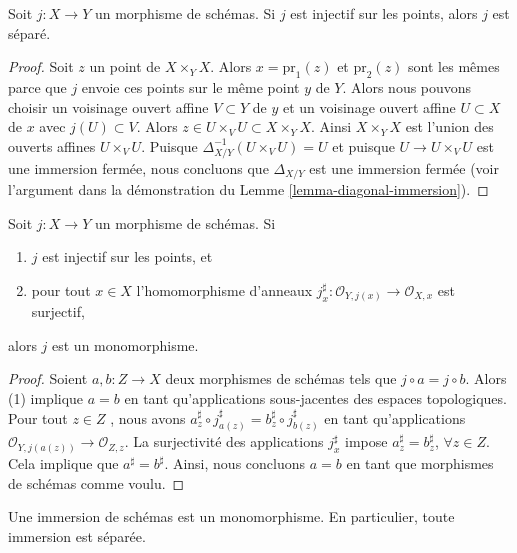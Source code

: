 \begin{lemma}
\label{lemma-injective-points}
Soit  $j : X \to Y$  un morphisme de schémas. Si  $j$  est injectif sur les
points, alors  $j$  est séparé.
\end{lemma}

\begin{proof}
Soit  $z$  un point de  $X \times_Y X$. Alors  $x = \text{pr}_1(z)$  et  $\text{pr}_2(z)$ 
sont les mêmes parce que  $j$  envoie ces points sur le même point
 $y$  de  $Y$. Alors nous pouvons choisir un voisinage ouvert
affine  $V \subset Y$  de  $y$  et un voisinage ouvert affine  $U \subset X$  de
 $x$  avec  $j(U) \subset V$. Alors  $z \in U \times_V U \subset X \times_Y X$. Ainsi  $X \times_Y X$  est l'union
des ouverts affines  $U \times_V U$. Puisque  $\Delta_{X/Y}^{-1}(U \times_V U) = U$  et puisque  $U \to U \times_V U$  est
une immersion fermée, nous concluons que  $\Delta_{X/Y}$  est une immersion fermée
(voir l'argument dans la démonstration du Lemme  \ref{lemma-diagonal-immersion}).
\end{proof}

\begin{lemma}
\label{lemma-injective-points-surjective-stalks}
Soit  $j : X \to Y$  un morphisme de schémas. Si
\begin{enumerate}
\item $j$  est injectif sur les points, et
\item pour tout  $x \in X$  l'homomorphisme d'anneaux  $j^\sharp_x : \mathcal{O}_{Y, j(x)} \to \mathcal{O}_{X, x}$  est surjectif,
\end{enumerate}
alors  $j$  est un monomorphisme.
\end{lemma}

\begin{proof}
Soient  $a, b : Z \to X$  deux morphismes de schémas tels que  $j \circ a  = j \circ b$. Alors (1)
implique  $a = b$  en tant qu'applications sous-jacentes des espaces
topologiques. Pour tout  $z \in Z$ , nous avons  $a^\sharp_z \circ j^\sharp_{a(z)} = b^\sharp_z \circ j^\sharp_{b(z)}$  en tant
qu'applications  $\mathcal{O}_{Y, j(a(z))} \to \mathcal{O}_{Z, z}$. La surjectivité des applications  $j^\sharp_x$  impose
 $a^\sharp_z = b^\sharp_z$,  $\forall z \in Z$. Cela implique que  $a^\sharp = b^\sharp$. Ainsi, nous concluons
 $a = b$  en tant que morphismes de schémas comme voulu.
\end{proof}

\begin{lemma}
\label{lemma-immersions-monomorphisms}
Une immersion de schémas est un monomorphisme. En particulier, toute immersion est
séparée.
\end{lemma}

